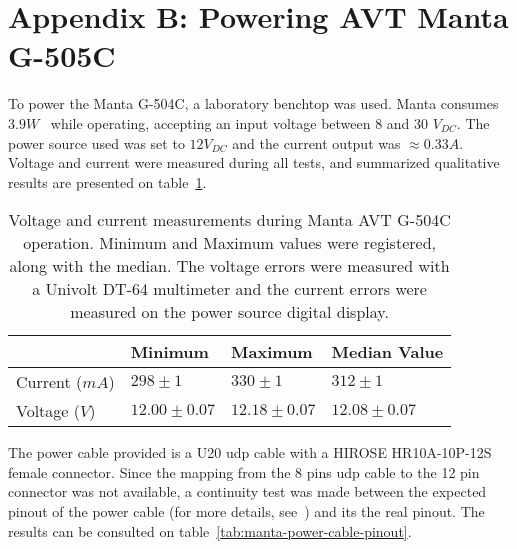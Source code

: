 \section{Appendix B: Powering AVT Manta G-505C}
\label{sec:appendix-b}

To power the Manta G-504C, a laboratory benchtop was used. Manta consumes $3.9 W$~\cite{MantaG504C} while operating, accepting an input voltage between $8$ and $30$ $V_{DC}$. The power source used was set to  $12 V_{DC}$ and the current output was $\approx 0.33A$. Voltage and current were measured during all tests, and summarized qualitative results are presented on table~\ref{tab:manta-power}. 
	
\begin{table}[!ht]
	\centering
	\renewcommand{\arraystretch}{1.2}
	\renewcommand{\tabcolsep}{0.45cm}
	\begin{tabular}{@{}llll@{}}
		\toprule
					  & Minimum & Maximum & Median Value \\ \midrule
		Current ($mA$) & $298 \pm 1$ & $330\pm 1$ & $312 \pm 1$ \\
		Voltage ($V$)  & $12.00\pm 0.07 $ & $12.18\pm 0.07$ & $12.08\pm0.07$ \\
		\bottomrule
	\end{tabular}
	\centering
	\caption{Voltage and current measurements during Manta AVT G-504C operation. Minimum and Maximum values were registered, along with the median. The voltage errors were measured with a Univolt DT-64 multimeter and the current errors were measured on the power source digital display.}
	\label{tab:manta-power}
\end{table}

The power cable provided is a U20 \ac{udp} cable with a HIROSE HR10A-10P-12S female connector. Since the mapping from the 8 pins \ac{udp} cable to the 12 pin connector was not available, a continuity test was made between the expected pinout of the power cable (for more details, see~\cite{AVTCables}) and its the real pinout. The results can be consulted on table~\ref{tab:manta-power-cable-pinout}.

